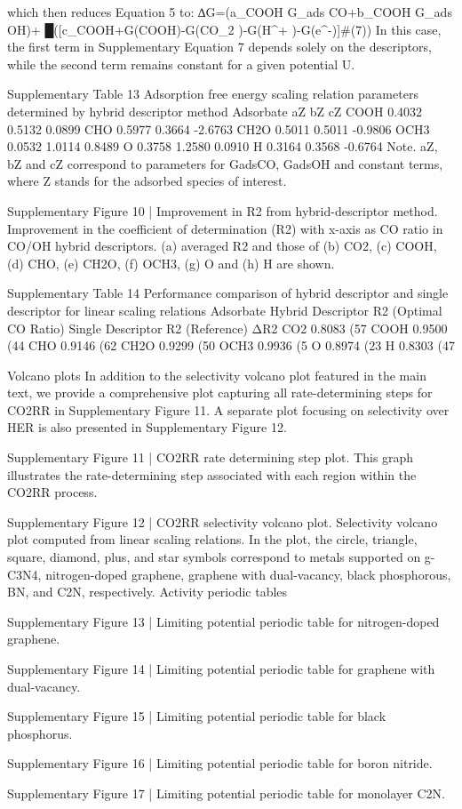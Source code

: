 which then reduces Equation 5 to:
∆G=(a_COOH G_ads CO+b_COOH G_ads OH)+
█([c_COOH+G(COOH)-G(CO_2 )-G(H^+ )-G(e^-)]#(7))
In this case, the first term in Supplementary Equation 7 depends solely on the descriptors, while the second term remains constant for a given potential U.


Supplementary Table 13
Adsorption free energy scaling relation parameters determined by hybrid descriptor method
Adsorbate	aZ	bZ	cZ
COOH	0.4032	0.5132	0.0899
CHO	0.5977	0.3664	-2.6763
CH2O	0.5011	0.5011	-0.9806
OCH3	0.0532	1.0114	0.8489
O	0.3758	1.2580	0.0910
H	0.3164	0.3568	-0.6764
Note. aZ, bZ and cZ correspond to parameters for GadsCO, GadsOH and constant terms, where Z stands for the adsorbed species of interest.



Supplementary Figure 10 | Improvement in R2 from hybrid-descriptor method. Improvement in the coefficient of determination (R2) with x-axis as CO ratio in CO/OH hybrid descriptors. (a) averaged R2 and those of (b) CO2, (c) COOH, (d) CHO, (e) CH2O, (f) OCH3, (g) O and (h) H are shown.

Supplementary Table 14
Performance comparison of hybrid descriptor and single descriptor for linear scaling relations
Adsorbate	Hybrid Descriptor R2
(Optimal CO Ratio)	Single Descriptor R2
(Reference)	ΔR2
CO2	0.8083 (57 %
COOH	0.9500 (44 %
CHO	0.9146 (62 %
CH2O	0.9299 (50 %
OCH3	0.9936 (5 %
O	0.8974 (23 %
H	0.8303 (47 %


Volcano plots
In addition to the selectivity volcano plot featured in the main text, we provide a comprehensive plot capturing all rate-determining steps for CO2RR in Supplementary Figure 11. A separate plot focusing on selectivity over HER is also presented in Supplementary Figure 12.


Supplementary Figure 11 | CO2RR rate determining step plot. This graph illustrates the rate-determining step associated with each region within the CO2RR process.


Supplementary Figure 12 | CO2RR selectivity volcano plot. Selectivity volcano plot computed from linear scaling relations. In the plot, the circle, triangle, square, diamond, plus, and star symbols correspond to metals supported on g-C3N4, nitrogen-doped graphene, graphene with dual-vacancy, black phosphorous, BN, and C2N, respectively.
Activity periodic tables


Supplementary Figure 13 | Limiting potential periodic table for nitrogen-doped graphene.


Supplementary Figure 14 | Limiting potential periodic table for graphene with dual-vacancy.


Supplementary Figure 15 | Limiting potential periodic table for black phosphorus.


Supplementary Figure 16 | Limiting potential periodic table for boron nitride.


Supplementary Figure 17 | Limiting potential periodic table for monolayer C2N.

